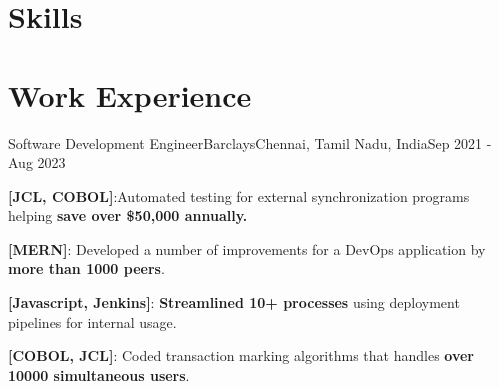 \documentclass[letterpaper]{resume_config}
\begin{document}
\section{Skills}


\section{Work Experience}

\WorkExperience
    {Software Development Engineer}{Barclays}{Chennai, Tamil Nadu, India}{Sep 2021 - Aug 2023}
    {
        \item {\textbf{[JCL, COBOL]}:Automated testing for external synchronization programs helping \textbf{save over \$50,000 annually.}}
        \item {\textbf{[MERN]}: {Developed a number of improvements for a DevOps application by \textbf{more than 1000 peers}.}} 
        \item {\textbf{[Javascript, Jenkins]}: \textbf{Streamlined 10+ processes} using deployment pipelines for internal usage.}
        \item {\textbf{[COBOL, JCL]}: Coded transaction marking algorithms that handles \textbf{over 10000 simultaneous users}.}
    }

\end{document}
